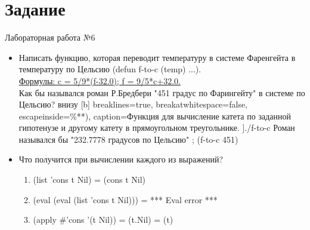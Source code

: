 \newpage
\section*{Задание}
\Large{Лабораторная работа №6}

\begin{itemize}
	\item Написать функцию, которая переводит температуру в системе Фаренгейта в температуру по Цельсию (defun f-to-c (temp) ...).\\
	\underline{Формулы: c = 5/9*(f-32.0); f = 9/5*c+32.0.}\\
	Как бы назывался роман Р.Бредбери "451 градус по Фарингейту" в системе по Цельсию?
	 внизу [b] 
		breaklines=true,           %
		breakatwhitespace=false, %
		escapeinside={\%*}{*)},  %
		caption=Функция для вычисление катета по заданной гипотенузе и другому катету в прямоугольном треугольнике.
		]{./f-to-c}
	Роман назывался бы "232.7778 градусов по Цельсию" ; (f-to-c 451)
	\item Что получится при вычислении каждого из выражений?
		\begin{enumerate}
			\item (list 'cons t Nil) = (cons t Nil)
			\item (eval (eval (list 'cons t Nil))) = *** Eval error ***
			\item (apply \#'cons '(t Nil)) = (t.Nil) = (t)

\end{enumerate}
\end{itemize}

